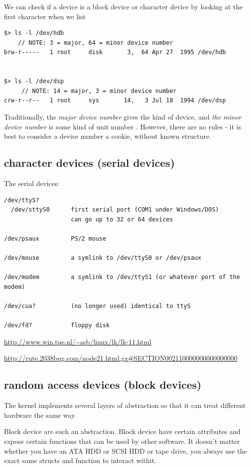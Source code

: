 We can check if a device is a block device or character device by looking at the
first character when we list 
\begin{verbatim}
$> ls -l /dev/hdb
    // NOTE: 3 = major, 64 = minor device number
brw-r-----   1 root     disk       3,  64 Apr 27  1995 /dev/hdb


$> ls -l /dev/dsp
     // NOTE: 14 = major, 3 = minor device number
crw-r--r--   1 root     sys       14,   3 Jul 18  1994 /dev/dsp
\end{verbatim}

Traditionally, the {\it major device number} gives the kind of device, and {\it
the minor device number} is some kind of unit number . However, there are no
rules - it is best to consider a device number a cookie, without known
structure. 

\subsection{character devices (serial devices)}
\label{sec:device_character}

The serial devices:
\begin{verbatim}
/dev/ttyS?
  /dev/sttyS0      first serial port (COM1 under Windows/DOS)
  				   can go up to 32 or 64 devices

/dev/psaux         PS/2 mouse

/dev/mouse         a symlink to /dev/ttyS0 or /dev/psaux

/dev/modem         a symlink to /dev/ttyS1 (or whatever port of the modem)

/dev/cua?          (no longer used) identical to ttyS

/dev/fd?           floppy disk  
\end{verbatim}
\url{http://www.win.tue.nl/~aeb/linux/lk/lk-11.html}

\url{http://rute.2038bug.com/node21.html.gz#SECTION002110000000000000000}


\subsection{random access devices (block devices)}
\label{sec:block-device}
\label{sec:random-access-device}

The kernel implements several layers of abstraction so that it can treat
different hardware the same way.

Block device are such an abstraction. Block device have certain attributes and
expose certain functions that can be used by other software. It doesn't matter
whether you have an ATA HDD or SCSI HDD or tape drive, you always use the exact
same structs and function to interact withit.

